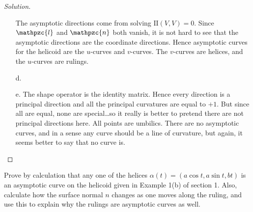 \documentclass[Shifrin_Solutions_Spring_2015]{subfiles}
\begin{document}
\begin{proof}[Solution]
\begin{itemize}
The asymptotic directions come from solving $\mathrm{II}(V,V)=0$. Since $\mathpzc{l}$ and $\mathpzc{n}$ both vanish, it is not hard to see that the asymptotic directions are the coordinate directions. Hence asymptotic curves for the helicoid are the $u$-curves and $v$-curves. The $v$-curves are helices, and the $u$-curves are rulings.


\item[d.]

\item[e.] The shape operator is the identity matrix. Hence every direction is a principal direction and all the principal curvatures are equal to $+1$. But since all are equal, none are special\dots so it really is better to pretend there are not principal directions here. All points are umbilics. There are no asymptotic curves, and in a sense any curve should be a line of curvature, but again, it seems better to say that no curve is.

\end{itemize}
\end{proof}

\begin{exercise}
Prove by calculation that any one of the helices $\alpha(t) = \left( a\cos t , a\sin t , bt\right)$ is an asymptotic curve on the helicoid given in Example 1(b) of section 1. Also, calculate how the surface normal $n$ changes as one moves along the ruling, and use this to explain why the rulings are asymptotic curves as well.
\end{exercise}
\end{document}
